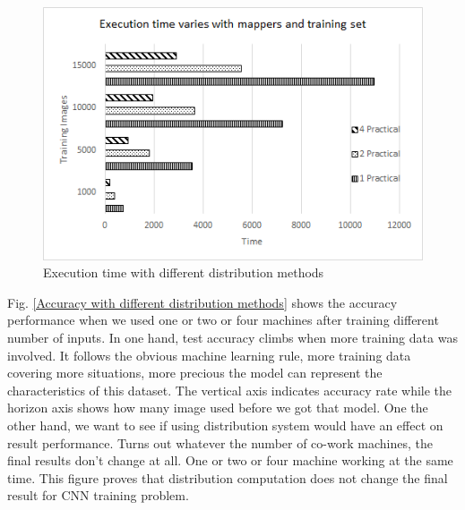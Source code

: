 \begin {figure}[t]
\centering
\includegraphics[width=1\columnwidth]{FigExecutionTime.png}
\vspace{-10pt}
\caption{Execution time with different distribution methods}
\label{Execution time with different distribution methods}
\vspace{-10pt}
\end {figure}

Fig. \ref{Accuracy with different distribution methods} shows the accuracy performance when we used one or two or four machines after training different number of inputs. In one hand, test accuracy climbs when more training data was involved. It follows the obvious machine learning rule, more training data covering more situations, more precious the model can represent the characteristics of this dataset. The vertical axis indicates accuracy rate while the horizon axis shows how many image used before we got that model. One the other hand, we want to see if using distribution system would have an effect on result performance. Turns out whatever the number of co-work machines, the final results don't change at all. One or two or four machine working at the same time. This figure proves that distribution computation does not change the final result for CNN training problem. 

